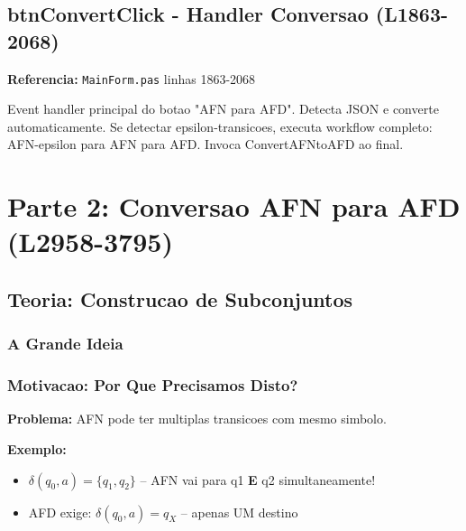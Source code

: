 \documentclass[12pt,a4paper]{article}
\begin{document}
\subsection{btnConvertClick - Handler Conversao (L1863-2068)}

\textbf{Referencia:} \texttt{MainForm.pas} linhas 1863-2068

Event handler principal do botao "AFN para AFD". Detecta JSON e converte automaticamente. Se detectar epsilon-transicoes, executa workflow completo: AFN-epsilon para AFN para AFD. Invoca ConvertAFNtoAFD ao final.

\newpage
\section{Parte 2: Conversao AFN para AFD (L2958-3795)}

\subsection{Teoria: Construcao de Subconjuntos}

\subsubsection{A Grande Ideia}

\begin{center}
\end{center}

\subsubsection{Motivacao: Por Que Precisamos Disto?}

\textbf{Problema:} AFN pode ter multiplas transicoes com mesmo simbolo.

\textbf{Exemplo:}
\begin{itemize}
    \item $\delta(q_0, a) = \{q_1, q_2\}$ -- AFN vai para q1 \textbf{E} q2 simultaneamente!
    \item AFD exige: $\delta(q_0, a) = q_X$ -- apenas UM destino
\end{itemize}
\end{document}

